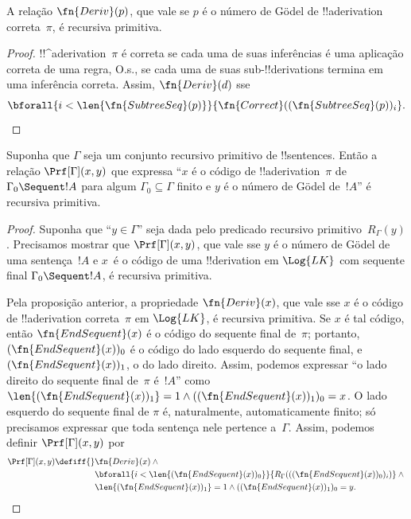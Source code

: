 \documentclass[../../../include/open-logic-section]{subfiles}
\begin{document}
\begin{prop}
  A relação $\fn{Deriv}(p)$, que vale se $p$ é o número de G\"odel de
  !!a{derivation} correta~$\pi$, é recursiva primitiva.
\end{prop}

\begin{proof}
  !!^a{derivation}~$\pi$ é correta se cada uma de suas inferências é
  uma aplicação correta de uma regra, O.s.\@, se cada uma de suas
  sub-!!{derivation}s termina em uma inferência correta. Assim,
  $\fn{Deriv}(d)$ sse
  \[
  \bforall{i<\len{\fn{SubtreeSeq}(p)}}{\fn{Correct}((\fn{SubtreeSeq}(p))_i}.
  \]
\end{proof}


\begin{prop}
Suponha que $\Gamma$ seja um conjunto recursivo primitivo de
!!{sentence}s. Então a relação $\Prf[\Gamma](x, y)$ que expressa ``$x$
é o código de !!a{derivation}~$\pi$ de $\Gamma_0 \Sequent !A$ para
algum $\Gamma_0 \subseteq \Gamma$ finito e $y$ é o número de G\"odel
de~$!A$'' é recursiva primitiva.
\end{prop}

\begin{proof}
Suponha que ``$y \in \Gamma$'' seja dada pelo predicado recursivo
primitivo~$R_\Gamma(y)$. Precisamos mostrar que $\Prf[\Gamma](x, y)$,
que vale sse $y$ é o número de G\"odel de uma sentença~$!A$ e $x$~é o
código de uma !!{derivation} em $\Log{LK}$ com sequente final
$\Gamma_0 \Sequent !A$, é recursiva primitiva.

Pela proposição anterior, a propriedade $\fn{Deriv}(x)$, que vale sse
$x$ é o código de !!a{derivation} correta~$\pi$ em $\Log{LK}$, é
recursiva primitiva. Se $x$ é tal código, então $\fn{EndSequent}(x)$ é
o código do sequente final de~$\pi$; portanto,
$(\fn{EndSequent}(x))_0$ é o código do lado esquerdo do sequente final,
e $(\fn{EndSequent}(x))_1$, o do lado direito. Assim, podemos expressar
``o lado direito do sequente final de~$\pi$ é~$!A$'' como
$\len{(\fn{EndSequent}(x))_1} = 1 \land ((\fn{EndSequent}(x))_1)_0 =
x$. O lado esquerdo do sequente final de $\pi$ é, naturalmente,
automaticamente finito; só precisamos expressar que toda sentença nele
pertence a~$\Gamma$. Assim, podemos definir $\Prf[\Gamma](x, y)$ por
\begin{align*}
\Prf[\Gamma](x, y) \defiff {}&
\fn{Deriv}(x) \land {} \\
& \bforall{i <
  \len{(\fn{EndSequent}(x))_0}}{R_\Gamma(((\fn{EndSequent}(x))_0)_i)} \land {}\\
& \len{(\fn{EndSequent}(x))_1} = 1 \land ((\fn{EndSequent}(x))_1)_0 = y.
\end{align*}
\end{proof}
\end{document}
